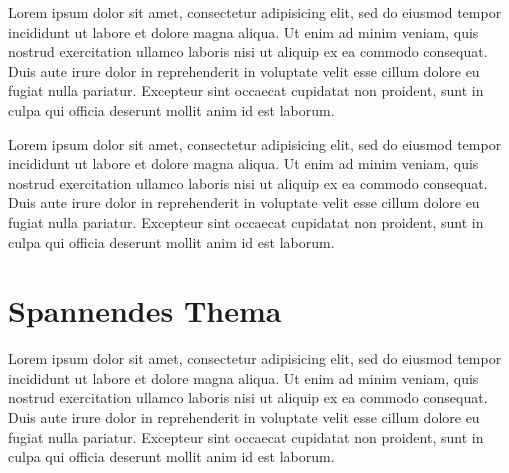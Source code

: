 \documentclass[10pt,a4paper,compsoc]{IEEEtran}
\begin{document}
Lorem ipsum dolor sit amet, consectetur adipisicing elit, sed do eiusmod tempor incididunt ut labore et dolore magna aliqua. Ut enim ad minim veniam, quis nostrud exercitation ullamco laboris nisi ut aliquip ex ea commodo consequat. Duis aute irure dolor in reprehenderit in voluptate velit esse cillum dolore eu fugiat nulla pariatur. Excepteur sint occaecat cupidatat non proident, sunt in culpa qui officia deserunt mollit anim id est laborum.

Lorem ipsum dolor sit amet, consectetur adipisicing elit, sed do eiusmod tempor incididunt ut labore et dolore magna aliqua. Ut enim ad minim veniam, quis nostrud exercitation ullamco laboris nisi ut aliquip ex ea commodo consequat. Duis aute irure dolor in reprehenderit in voluptate velit esse cillum dolore eu fugiat nulla pariatur. Excepteur sint occaecat cupidatat non proident, sunt in culpa qui officia deserunt mollit anim id est laborum.

\section{Spannendes Thema}

Lorem ipsum dolor sit amet, consectetur adipisicing elit, sed do eiusmod tempor incididunt ut labore et dolore magna aliqua. Ut enim ad minim veniam, quis nostrud exercitation ullamco laboris nisi ut aliquip ex ea commodo consequat. Duis aute irure dolor in reprehenderit in voluptate velit esse cillum dolore eu fugiat nulla pariatur. Excepteur sint occaecat cupidatat non proident, sunt in culpa qui officia deserunt mollit anim id est laborum.



\end{document}
